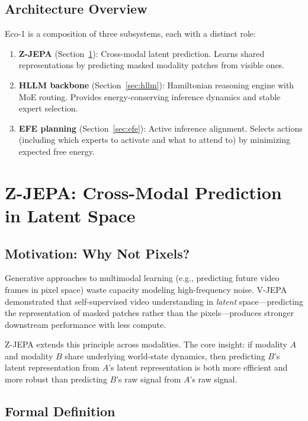 \documentclass[11pt,letterpaper]{article}
\begin{document}
\subsection{Architecture Overview}

Eco-1 is a composition of three subsystems, each with a distinct role:

\begin{enumerate}
    \item \textbf{Z-JEPA} (Section~\ref{sec:zjepa}): Cross-modal latent prediction. Learns shared representations by predicting masked modality patches from visible ones.
    \item \textbf{HLLM backbone} (Section~\ref{sec:hllm}): Hamiltonian reasoning engine with MoE routing. Provides energy-conserving inference dynamics and stable expert selection.
    \item \textbf{EFE planning} (Section~\ref{sec:efe}): Active inference alignment. Selects actions (including which experts to activate and what to attend to) by minimizing expected free energy.
\end{enumerate}

\section{Z-JEPA: Cross-Modal Prediction in Latent Space}
\label{sec:zjepa}

\subsection{Motivation: Why Not Pixels?}

Generative approaches to multimodal learning (e.g., predicting future video frames in pixel space) waste capacity modeling high-frequency noise. V-JEPA~\cite{bardes2024vjepa} demonstrated that self-supervised video understanding in \emph{latent} space---predicting the representation of masked patches rather than the pixels---produces stronger downstream performance with less compute.

Z-JEPA extends this principle across modalities. The core insight: if modality $A$ and modality $B$ share underlying world-state dynamics, then predicting $B$'s latent representation from $A$'s latent representation is both more efficient and more robust than predicting $B$'s raw signal from $A$'s raw signal.

\subsection{Formal Definition}
\end{document}
